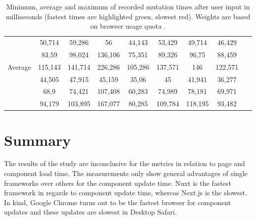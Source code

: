 \documentclass[a4paper, 12pt]{article}
\begin{document}
\begin{table}[h]
{\begin{adjustbox}{angle=0}
{\begin{tabular}{|l|c|c|c|c|c|c|c|r|}
                 \hline
                                                     & 50,714  & 59,286                    & 56                        & 44,143                  & 53,429  & 49,714  & 46,429  & ~       \\
                                                     & 83,59   & 98,024                    & 136,106                   & 75,351                  & 89,326  & 96,75   & 88,459  & ~       \\
                 \multirow{-3}{*}{Average}           & 115,143 & 141,714                   & 226,286                   & 105,286                 & 137,571 & 146     & 122,571 & ~       \\ \hline
\rowcolor{white}                                     & 44,505  & 47,915                    & 45,159                    & 35,06                   & 45      & 41,941  & 36,277  & ~       \\
\rowcolor{white}                                     & 68,9    & 74,421                    & 107,408                   & 60,283                  & 74,989  & 78,181  & 69,971  & ~       \\
\rowcolor{white} \multirow{-3}{*}{Weighted average}  & 94,179  & 103,895                   & 167,077                   & 80,285                  & 109,784 & 118,195 & 93,482  & ~       \\ \hline
      \end{tabular}
    }
  \end{adjustbox}
  \caption{Minimum, average and maximum of recorded mutation times after user input in milliseconds (fastest times are highlighted green, slowest red). Weights are based on browser usage quota \citep{browserUsage}.}
  \label{tab:mutations:times}
  }
\end{table}

\section{Summary}

The results of the study are inconclusive for the metrics in relation to page and component load time.
The measurements only show general advantages of single frameworks over others for the component update time.
Nuxt is the fastest framework in regards to component update time, whereas Next.js is the slowest.
In kind, Google Chrome turns out to be the fastest browser for component updates and these updates are slowest in Desktop Safari.
\end{document}
